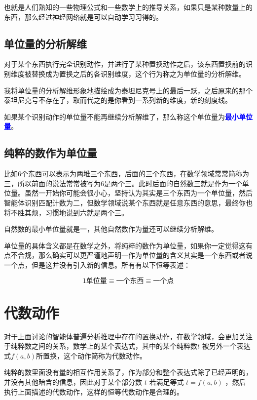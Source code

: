 \documentclass[12pt,oneside]{book}
\renewcommand{\emph}[1]{\textcolor{blue}{\textbf{#1}}}
\begin{document}
也就是人们熟知的一些物理公式和一些数学上的推导关系，如果只是某种数量上的东西，那么经过神经网络就是可以自动学习习得的。



\subsection{单位量的分析解维}
对于某个东西执行完全识别动作，并进行了某种置换动作之后，该东西置换前的识别维度被替换成为置换之后的各识别维度，这个行为称之为单位量的分析解维。

我将单位量的分析解维形象地描绘成为泰坦尼克号上的最后一跃，之后原来的那个泰坦尼克号不存在了，取而代之的是你看到一系列新的维度，新的刻度线。

如果某个识别动作的单位量不能再继续分析解维了，那么称这个单位量为\emph{最小单位量}。


\subsection{纯粹的数作为单位量}
比如6个东西可以表示为两堆三个东西，后面的三个东西，在数学领域常常简称为三，所以前面的说法常常被写为6是两个三。此时后面的自然数三就是作为一个单位量。虽然一开始你可能会很小心，坚持认为其实是三个东西为一个单位量，然后智能体识别匹配计数为二，但数学领域说某个东西就是任意东西的意思，最终你也将不胜其烦，习惯地说到六就是两个三。

自然数的最小单位量就是一，其他自然数作为量还可以继续分析解维。

单位量的具体含义都是在数学之外，将纯粹的数作为单位量，如果你一定觉得这有点不合规，那么确实可以更严谨地声明一作为单位量的含义其实是一个东西或者说一个点，但是这并没有引入新的信息。所有有以下恒等表述：

\begin{equation}
\label{eq:2.1}
1\text{单位量} \equiv \text{一个东西} \equiv \text{一个点}
\end{equation}


\section{代数动作}
对于上面讨论的智能体普遍分析推理中存在的置换动作，在数学领域，会更加关注于纯粹数之间的关系，数学上的某个表达式，其中的某个纯粹数$t$ 被另外一个表达式$f(a,b)$所置换，这个动作简称为代数动作。

纯粹的数里面没有量的相互作用关系了，作为部分和整个表达式除了已经声明的，并没有其他暗含的信息，因此对于某个部分数 $t$ 若满足等式 $t=f(a,b)$ ，然后执行上面描述的代数动作，这样的恒等代数动作是合理的。
\end{document}

